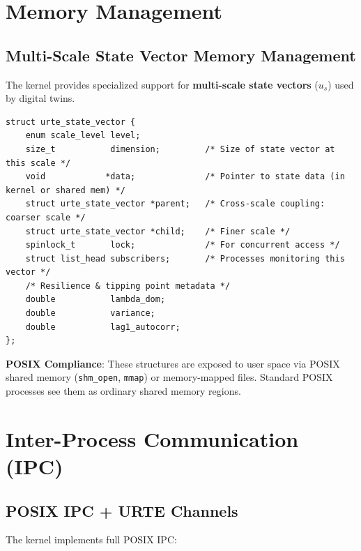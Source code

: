 \documentclass[11pt,a4paper]{report}
\begin{document}
\chapter{Memory Management}

\section{Multi-Scale State Vector Memory Management}

The kernel provides specialized support for \textbf{multi-scale state vectors} ($u_s$) used by digital twins.

\begin{lstlisting}[style=kernelschema, caption={Multi-Scale State Vector Memory Region}]
struct urte_state_vector {
    enum scale_level level;
    size_t           dimension;         /* Size of state vector at this scale */
    void            *data;              /* Pointer to state data (in kernel or shared mem) */
    struct urte_state_vector *parent;   /* Cross-scale coupling: coarser scale */
    struct urte_state_vector *child;    /* Finer scale */
    spinlock_t       lock;              /* For concurrent access */
    struct list_head subscribers;       /* Processes monitoring this vector */
    /* Resilience & tipping point metadata */
    double           lambda_dom;
    double           variance;
    double           lag1_autocorr;
};
\end{lstlisting}

\textbf{POSIX Compliance}: These structures are exposed to user space via POSIX shared memory (\texttt{shm\_open}, \texttt{mmap}) or memory-mapped files. Standard POSIX processes see them as ordinary shared memory regions.

\chapter{Inter-Process Communication (IPC)}

\section{POSIX IPC + URTE Channels}

The kernel implements full POSIX IPC:
\end{document}
